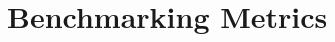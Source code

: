 \begingroup

\renewcommand{\arraystretch}{1}
\section{Benchmarking Metrics}


\FloatBarrier
\endgroup
